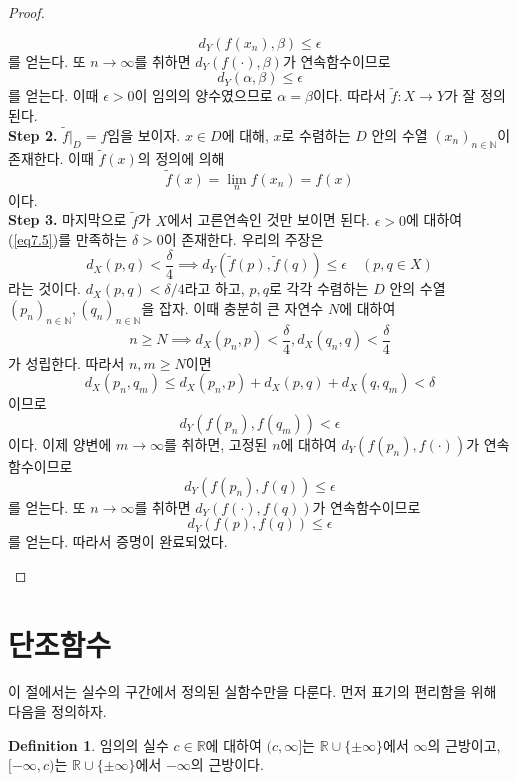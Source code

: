 \documentclass[11pt]{book}
\numberwithin{equation}{chapter}
\def\NN{\mathbb{N}}
\def\RR{\mathbb{R}}
\def\eps{\epsilon}
\theoremstyle{definition}
\newtheorem{defn}[thm]{Definition}
\newenvironment{enum}
	{\begin{enumerate}[label=(\alph*), leftmargin=2\parindent]}
	{\end{enumerate}}
\begin{document}
\begin{proof}
\begin{enum}
        \[
        d_Y(f(x_n), \beta) \le \eps    
        \]
        를 얻는다. 또 \(n \to \infty\)를 취하면 \(d_Y(f(\cdot), \beta)\)가 연속함수이므로
        \[
            d_Y(\alpha, \beta) \le \eps
        \]
        를 얻는다. 이때 \(\eps > 0\)이 임의의 양수였으므로 \(\alpha = \beta\)이다. 따라서 \(\tilde{f} : X \to Y\)가 잘 정의된다.\\
        \textbf{Step 2.} \(\tilde{f} \vert_D = f\)임을 보이자. \(x \in D\)에 대해, \(x\)로 수렴하는 \(D\) 안의 수열 \((x_n)_{n \in \NN}\)이 존재한다. 이때 \(\tilde{f}(x)\)의 정의에 의해
        \[
        \tilde{f}(x) = \lim_{n } f(x_n) = f(x)    
        \]
        이다.\\
        \textbf{Step 3.} 마지막으로 \(\tilde{f}\)가 \(X\)에서 고른연속인 것만 보이면 된다. \(\eps > 0\)에 대하여 (\ref{eq7.5})를 만족하는 \(\delta > 0\)이 존재한다. 우리의 주장은
        \[
            d_X(p, q) < \frac{\delta}{4} \implies d_Y(\tilde{f}(p), \tilde{f}(q)) \le \eps \quad (p, q \in X) 
        \]
        라는 것이다. \(d_X(p, q) < \delta/4\)라고 하고, \(p, q\)로 각각 수렴하는 \(D\) 안의 수열 \((p_n)_{n \in \NN}, (q_n)_{n \in \NN}\)을 잡자. 이때 충분히 큰 자연수 \(N\)에 대하여
        \[
            n \ge N \implies d_X(p_n, p) < \frac{\delta}{4}, d_X(q_n, q) < \frac{\delta}{4}
        \]
        가 성립한다. 따라서 \(n, m \ge N\)이면
        \[
        d_X(p_n, q_m) \le d_X(p_n, p) + d_X(p, q) + d_X(q, q_m) < \delta    
        \]
        이므로
        \[
        d_Y(f(p_n), f(q_m)) < \eps    
        \]
        이다. 이제 양변에 \(m \to \infty\)를 취하면, 고정된 \(n\)에 대하여 \(d_Y(f(p_n), f(\cdot))\)가 연속함수이므로
        \[
        d_Y(f(p_n), f(q)) \le \eps    
        \]
        를 얻는다. 또 \(n \to \infty\)를 취하면 \(d_Y(f(\cdot), f(q))\)가 연속함수이므로
        \[
        d_Y(f(p), f(q)) \le \eps    
        \]
        를 얻는다. 따라서 증명이 완료되었다.
    \end{enum}
\end{proof}

\section{단조함수}

이 절에서는 실수의 구간에서 정의된 실함수만을 다룬다. 먼저 표기의 편리함을 위해 다음을 정의하자.

\begin{defn}
    임의의 실수 \(c \in \RR\)에 대하여 \((c, \infty]\)는 \(\RR \cup \{\pm \infty\}\)에서 \(\infty\)의 근방이고, \([-\infty, c)\)는 \(\RR \cup \{\pm \infty\}\)에서 \(-\infty\)의 근방이다.
\end{defn}
\end{document}
